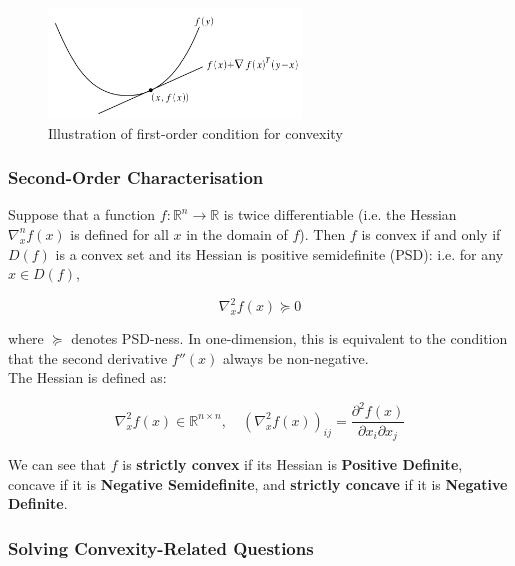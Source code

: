 \documentclass{article}
\begin{document}
\begin{figure}[H]
    \centering
    \includegraphics[width=0.6\textwidth]{Images/firstoderconvexity.png}
    \caption{Illustration of first-order condition for convexity}
    \label{fig:1-firstorderconvex}
\end{figure} 


\subsubsection{Second-Order Characterisation}
Suppose that a function $f: \mathbb{R}^{n} \to \mathbb{R}$ is twice differentiable (i.e. the Hessian $\nabla^{n}_x f(x)$ is defined for all $x$ in the domain of $f$). Then $f$ is convex if and only if $D(f)$ is a convex set and its Hessian is positive semidefinite (PSD): i.e. for any $x \in D(f)$, 

\begin{equation}
    \nabla^{2}_x f(x) \succeq 0 
\end{equation}

\noindent where $\succeq$ denotes PSD-ness. In one-dimension, this is equivalent to the condition that the second derivative $f''(x)$ always be non-negative. \\ 

\noindent The Hessian is defined as:

\begin{equation}
    \nabla^{2}_x f(x) \in \mathbb{R}^{n \times n}, \quad (\nabla^{2}_x f(x))_{ij} = \frac{\partial^{2} f(x)}{\partial x_i \partial x_j}
\end{equation}


\begin{theorem}
    We can see that $f$ is \textbf{strictly convex} if its Hessian is \textbf{Positive Definite}, concave if it is \textbf{Negative Semidefinite}, and \textbf{strictly concave} if it is \textbf{Negative Definite}.
\end{theorem}


\subsubsection{Solving Convexity-Related Questions}
\end{document}
